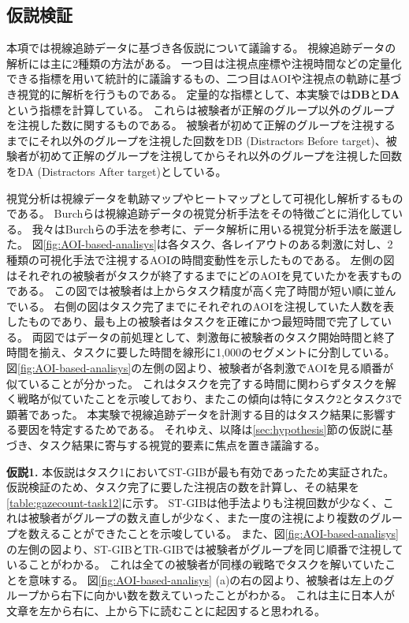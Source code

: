 \documentclass{kuee}
\begin{document}
\subsection{仮説検証}
\label{subsec:eyetrack_result_ex1}
本項では視線追跡データに基づき各仮説について議論する。
視線追跡データの解析には主に2種類の方法がある。
一つ目は注視点座標や注視時間などの定量化できる指標を用いて統計的に議論するもの、二つ目はAOIや注視点の軌跡に基づき視覚的に解析を行うものである。
定量的な指標として、本実験では{\bf DB}と{\bf DA}という指標を計算している。
これらは被験者が正解のグループ以外のグループを注視した数に関するものである。
被験者が初めて正解のグループを注視するまでにそれ以外のグループを注視した回数をDB (Distractors Before target)、被験者が初めて正解のグループを注視してからそれ以外のグループを注視した回数をDA (Distractors After target)としている。

視覚分析は視線データを軌跡マップやヒートマップとして可視化し解析するものである。
Burchらは視線追跡データの視覚分析手法をその特徴ごとに消化している。\cite{Burch2013VisualTS}
我々はBurchらの手法を参考に、データ解析に用いる視覚分析手法を厳選した。
図\ref{fig:AOI-based-analisys}は各タスク、各レイアウトのある刺激に対し、2種類の可視化手法で注視するAOIの時間変動性を示したものである。
左側の図はそれぞれの被験者がタスクが終了するまでにどのAOIを見ていたかを表すものである。
この図では被験者は上からタスク精度が高く完了時間が短い順に並んでいる。
右側の図はタスク完了までにそれぞれのAOIを注視していた人数を表したものであり、最も上の被験者はタスクを正確にかつ最短時間で完了している。
両図ではデータの前処理として、刺激毎に被験者のタスク開始時間と終了時間を揃え、タスクに要した時間を線形に1,000のセグメントに分割している。
図\ref{fig:AOI-based-analisys}の左側の図より、被験者が各刺激でAOIを見る順番が似ていることが分かった。
これはタスクを完了する時間に関わらずタスクを解く戦略が似ていたこと{}を示唆しており、またこの傾向は特にタスク2とタスク3で顕著であった。
本実験で視線追跡データを計測する目的はタスク結果に影響する要因を特定するためである。
それゆえ、以降は\ref{sec:hypothesis}節の仮説に基づき、タスク結果に寄与する視覚的要素に焦点を置き議論する。

{\bf 仮説1.} 本仮説はタスク1においてST-GIBが最も有効であったため実証された。
仮説検証のため、タスク完了に要した注視店の数を計算し、その結果を\ref{table:gazecount-task12}に示す。
ST-GIBは他手法よりも注視回数が少なく、これは被験者がグループの数え直しが少なく、また一度の注視により複数のグループを数えることができたことを示唆している。
また、図\ref{fig:AOI-based-analisys}の左側の図より、ST-GIBとTR-GIBでは被験者がグループを同じ順番で注視していることがわかる。
これは全ての被験者が同様の戦略でタスクを解いていたことを意味する。
図\ref{fig:AOI-based-analisys} (a)の右の図より、被験者は左上のグループから右下に向かい数を数えていったことがわかる。
これは主に日本人が文章を左から右に、上から下に読むことに起因すると思われる。
\end{document}
